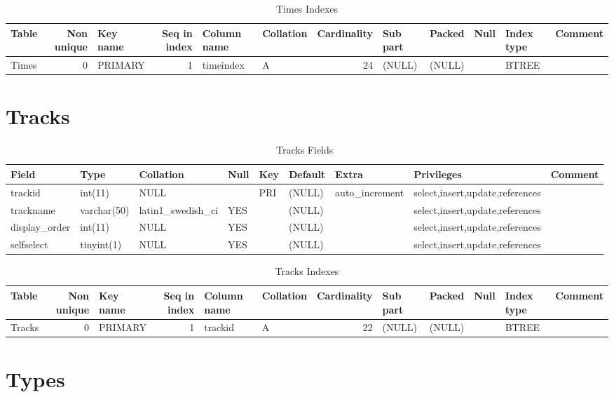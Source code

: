 \documentclass[captions=tablesignature]{scrartcl}
\begin{document}
\begin{table}[htb]
\caption{\label{tbl:timesindexes}Times Indexes}
\centering
\begin{tabular}{lrlrllrlllll}
\hline
Table & Non unique & Key name & Seq in index & Column name & Collation & Cardinality & Sub part & Packed & Null & Index type & Comment\\
\hline
Times & 0 & PRIMARY & 1 & timeindex & A & 24 & (NULL) & (NULL) &  & BTREE & \\
\hline
\end{tabular}
\end{table}
\section{Tracks}
\label{sec-32}

\begin{table}[htb]
\caption{\label{tbl:tracksfields}Tracks Fields}
\centering
\begin{tabular}{lllllllll}
\hline
Field & Type & Collation & Null & Key & Default & Extra & Privileges & Comment\\
\hline
trackid & int(11) & NULL &  & PRI & (NULL) & auto\_increment & select,insert,update,references & \\
trackname & varchar(50) & latin1\_swedish\_ci & YES &  & (NULL) &  & select,insert,update,references & \\
display\_order & int(11) & NULL & YES &  & (NULL) &  & select,insert,update,references & \\
selfselect & tinyint(1) & NULL & YES &  & (NULL) &  & select,insert,update,references & \\
\hline
\end{tabular}
\end{table}

\begin{table}[htb]
\caption{\label{tbl:trackssindexes}Tracks Indexes}
\centering
\begin{tabular}{lrlrllrlllll}
\hline
Table & Non unique & Key name & Seq in index & Column name & Collation & Cardinality & Sub part & Packed & Null & Index type & Comment\\
\hline
Tracks & 0 & PRIMARY & 1 & trackid & A & 22 & (NULL) & (NULL) &  & BTREE & \\
\hline
\end{tabular}
\end{table}
\section{Types}
\label{sec-33}
\end{document}
